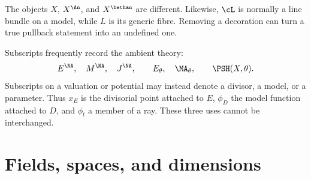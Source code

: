 \begin{remark}
\label{rem:appK-decorations}
The objects \(X\), \(X^{\An}\), and \(X^{\bethan}\) are different.  Likewise,
\(\cL\) is normally a line bundle on a model, while \(L\) is its generic
fibre.  Removing a decoration can turn a true pullback statement into an
undefined one.
\end{remark}

Subscripts frequently record the ambient theory:
\[
 E^{\NA},\quad M^{\NA},\quad J^{\NA},
 \qquad
 E_\theta,\quad \MA_\theta,
 \qquad
 \PSH(X,\theta).
\]
Subscripts on a valuation or potential may instead denote a divisor, a model,
or a parameter.  Thus \(x_E\) is the divisorial point attached to \(E\),
\(\phi_D\) the model function attached to \(D\), and \(\phi_t\) a member of
a ray.  These three uses cannot be interchanged.

\section{Fields, spaces, and dimensions}
\label{sec:appK-ambient}


